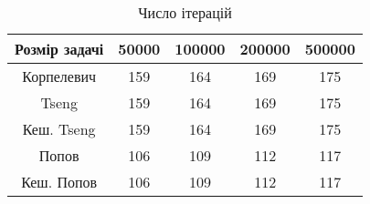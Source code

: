 \begin{table}[H]
	\centering
	\begin{tabular}{|c||c|c|c|c|}\hline
		Розмір задачі & 50000 & 100000 & 200000 & 500000 \\ \hline \hline
		Корпелевич & 159 & 164 & 169 & 175 \\ \hline
		Tseng & 159 & 164 & 169 & 175 \\ \hline
		Кеш. Tseng & 159 & 164 & 169 & 175 \\ \hline
		Попов & 106 & 109 & 112 & 117 \\ \hline
		Кеш. Попов & 106 & 109 & 112 & 117 \\ \hline
	\end{tabular}
	\caption{Число ітерацій}
\end{table}
